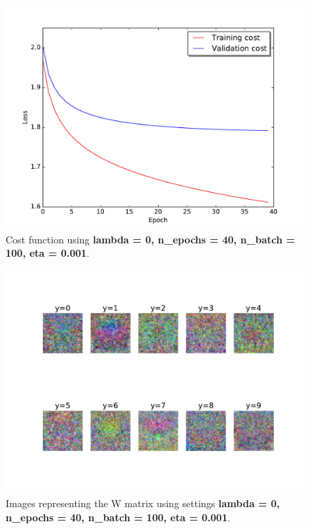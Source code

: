 \documentclass{article}
\begin{document}
\begin{figure}[H]
\centering
  \includegraphics[width = 12cm]{../Result_pics/secondCost2.pdf}
\caption{Cost function using \textbf{lambda = 0, n\_epochs = 40, n\_batch = 100, eta = 0.001}. }
\label{fig:secondCost}
\end{figure}

\begin{figure}[H]
\centering
  \includegraphics[width = 12cm]{../Result_pics/secondW2.pdf}
\caption{Images representing the W matrix using settings \textbf{lambda = 0, n\_epochs = 40, n\_batch = 100, eta = 0.001}.}
\label{fig:secondW}
\end{figure}
\end{document}
